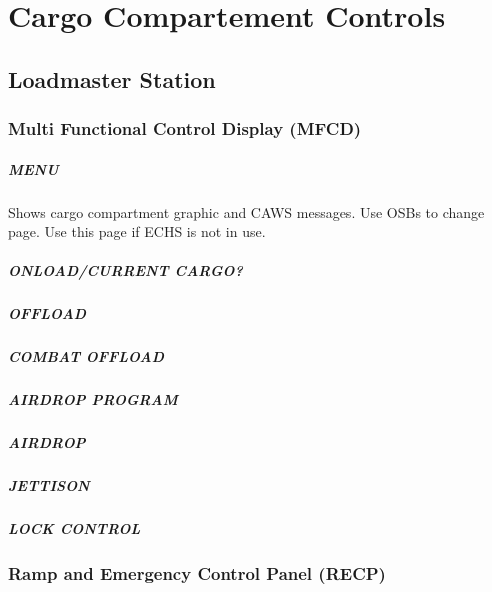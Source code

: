 \chapter{Cargo Compartement Controls}

\section{Loadmaster Station}

\subsection{Multi Functional Control Display (MFCD)}
\label{sec:mfcd}

\paragraph*{MENU}

Shows cargo compartment graphic and CAWS messages. Use \glspl{OSB} to change page. Use this page if \gls{ECHS} is not in use.

\paragraph*{ONLOAD/CURRENT CARGO?}

\paragraph*{OFFLOAD}

\paragraph*{COMBAT OFFLOAD}

\paragraph*{AIRDROP PROGRAM}

\paragraph*{AIRDROP}

\paragraph*{JETTISON}

\paragraph*{LOCK CONTROL}

\subsection{Ramp and Emergency Control Panel (RECP)}
\label{sec:recp}

